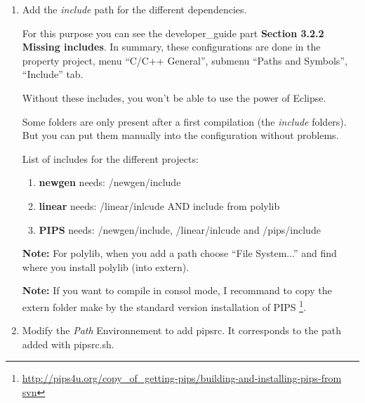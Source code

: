 \documentclass[a4paper]{article}
\newcommand{\LINK}[1]{\url{#1}\xspace}
\begin{document}
\begin{enumerate}
\item Add the \emph{include} path for the different dependencies.
\label{enum:it:addsymb}

For this purpose you can see the developer\_guide part \textbf{Section 3.2.2 Missing includes}.
In summary, these configurations are done in the property project, menu ``C/C++ General'', submenu ``Paths and Symbols'', ``Include'' tab.

Without these includes, you won't be able to use the power of Eclipse.

Some folders are only present after a first compilation (the \textit{include} folders). 
But you can put them manually into the configuration without problems.

List of includes for the different projects:
\begin{enumerate}
\item \textbf{newgen} needs: /newgen/include
\item \textbf{linear} needs: /linear/inlcude AND include from {\color{red} polylib}
\item \textbf{PIPS} needs:   /newgen/include, /linear/inlcude and /pips/include
\end{enumerate}

\textbf{Note:} For polylib, when you add a path choose ``File System...'' and find where you install polylib (into extern).

\textbf{Note:} If you want to compile in consol mode, I recommand to copy the extern folder make by the standard version installation of PIPS \footnote{\LINK{http://pips4u.org/copy_of_getting-pips/building-and-installing-pips-from svn}}.

\item Modify the \emph{Path} Environnement to add pipsrc. 
It corresponds to the path added with pipsrc.sh.
\label{enum:it:addpath}


\end{enumerate}
\end{document}

